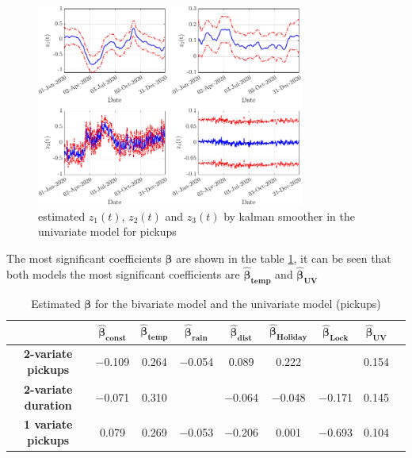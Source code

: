 \begin{figure}
	\centering
	\includegraphics[height=250px]{Images/Data analysis/DCM/Trend_z_biv.pdf}
	\caption[Estimated of latent z]{estimated $z_{1}(t)$,  $z_{2}(t)$ and $z_{3}(t)$ by kalman smoother in the univariate model for pickups}
	\label{Trend_zeta_latente}
\end{figure}

The most significant coefficients $\boldsymbol{\hat{\beta}}$ are shown in the  table \ref{z_latent trend}, it can be seen that both models the most significant coefficients are $\boldsymbol{\hat{\beta}_{temp}}$ and $\boldsymbol{\hat{\beta}_{UV}}$
 \begin{table}
	\centering
	\renewcommand\arraystretch{1.3}
	\begin{tabular}{c|c|c|c|c|c|c|c|c}
		\hline
		\textit{} & $\boldsymbol{\hat{\beta}_{const}}$ & $\boldsymbol{\hat{\beta}_{temp}}$ & $\boldsymbol{\hat{\beta}_{rain}}$ & $\boldsymbol{\hat{\beta}_{dist}}$ & $\boldsymbol{\hat{\beta}_{Holiday}}$ & $\boldsymbol{\hat{\beta}_{Lock}}$ & $\boldsymbol{\hat{\beta}_{UV}}$   \\
		\hline
		\textbf{2-variate pickups} & \num{-0.109} & \num{+0.264} & \num{-0.054} & \num{+0.089} & \num{+0.222} &  & \num{+0.154}  \\
		\hline
		\textbf{2-variate duration} & \num{-0.071} & \num{+0.310} &  & \num{-0.064} & \num{-0.048} & \num{-0.171} & \num{+0.145}  \\
		\hline
		\textbf{1 variate pickups} & \num{+0.079} & \num{+0.269} & \num{-0.053} & \num{-0.206} & \num{+0.001} & \num{-0.693} & \num{+0.104}\\
		\hline
	\end{tabular}
	\caption[Estimated $\boldsymbol{\beta}$ for the multivariate model model and the univariate model (pickups-DCM)]{Estimated $\boldsymbol{\beta}$ for the bivariate model and the univariate model (pickups) }
	\label{z_latent trend}
\end{table}